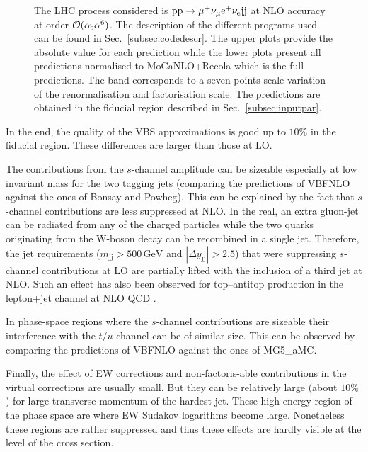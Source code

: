 \documentclass[twocolumn,epjc3]{svjour3} %
\newcommand{\Pj}{\ensuremath{\text{j}}\xspace}
\newcommand{\GeV}{\ensuremath{\,\text{GeV}}\xspace}
\begin{document}
\begin{figure}[hbt!]
{    The LHC process considered is ${\rm p}{\rm p}\to\mu^+\nu_\mu{\rm e}^+\nu_{\rm e}{\rm j}{\rm j}$ at NLO accuracy at order $\mathcal{O}(\alpha_{\rm s}\alpha^6)$.
    The description of the different programs used can be found in Sec.~\protect\ref{subsec:codedescr}.
    The upper plots provide the absolute value for each prediction while the lower plots present all predictions normalised to {\sc MoCaNLO}+{\sc Recola} which is the full predictions.
    The band corresponds to a seven-points scale variation of the renormalisation and factorisation scale.
    The predictions are obtained in the fiducial region described in Sec.~\protect\ref{subsec:inputpar}.
    }
    \end{figure}

    In the end, the quality of the VBS approximations is good up to $10\%$ in the fiducial region.
    These differences are larger than those at LO.

    The contributions from the $s$-channel amplitude can be sizeable especially at low invariant mass for the two tagging jets (comparing the predictions of {\sc VBFNLO} against the ones of {\sc Bonsay} and {\sc Powheg}).
    This can be explained by the fact that $s$-channel contributions are less suppressed at NLO.
    In the real, an extra gluon-jet can be radiated from any of the charged particles while the two quarks originating from the W-boson decay can be recombined in a single jet.
    Therefore, the jet requirements ($ m_{\Pj \Pj} >  500\GeV$ and $|\Delta y_{\Pj \Pj}| > 2.5$) that were suppressing $s$-channel contributions at LO are partially lifted with the inclusion of a third jet at NLO.
    Such an effect has also been observed for top--antitop production in the lepton+jet channel at NLO QCD \cite{Denner:2017kzu}.

    In phase-space regions where the $s$-channel contributions are sizeable their interference with the $t/u$-channel can be of similar size.
    This can be observed by comparing the predictions of {\sc VBFNLO} against the ones of {\sc MG5\_aMC}.

    Finally, the effect of EW corrections and non-\-factoris\hyp{}able contributions in the virtual corrections are usually small.
    But they can be relatively large (about $10\%$) for large transverse momentum of the hardest jet.
    These high-energy region of the phase space are where EW Sudakov logarithms become large.
    Nonetheless these regions are rather suppressed and thus these effects are hardly visible at the level of the cross section.
\end{document}
